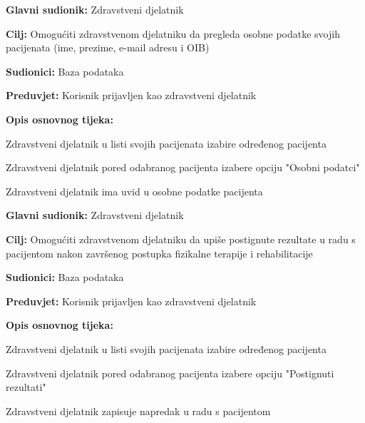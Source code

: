 \noindent {}
\begin{packed_item}
	
	\item \textbf{Glavni sudionik: }Zdravstveni djelatnik
	\item  \textbf{Cilj:} Omogućiti zdravstvenom djelatniku da pregleda osobne podatke svojih pacijenata (ime, prezime, e-mail adresu i OIB)
	\item  \textbf{Sudionici:} Baza podataka
	\item  \textbf{Preduvjet:} Korisnik prijavljen kao zdravstveni djelatnik
	\item  \textbf{Opis osnovnog tijeka:}
	
	\item[] \begin{packed_enum}
		
		\item Zdravstveni djelatnik u listi svojih pacijenata izabire određenog pacijenta
		\item Zdravstveni djelatnik pored odabranog pacijenta izabere opciju "Osobni podatci"
		\item Zdravstveni djelatnik ima uvid u osobne podatke pacijenta
	\end{packed_enum}
	
\end{packed_item}

\noindent {}
\begin{packed_item}
	
	\item \textbf{Glavni sudionik: }Zdravstveni djelatnik
	\item  \textbf{Cilj:} Omogućiti zdravstvenom djelatniku da upiše postignute rezultate u radu s pacijentom nakon završenog postupka fizikalne terapije i rehabilitacije
	\item  \textbf{Sudionici:} Baza podataka
	\item  \textbf{Preduvjet:} Korisnik prijavljen kao zdravstveni djelatnik
	\item  \textbf{Opis osnovnog tijeka:}
	
	\item[] \begin{packed_enum}
		
		\item Zdravstveni djelatnik u listi svojih pacijenata izabire određenog pacijenta
		\item Zdravstveni djelatnik pored odabranog pacijenta izabere opciju "Postignuti rezultati"
		\item Zdravstveni djelatnik zapisuje napredak u radu s pacijentom
	\end{packed_enum}
	
\end{packed_item}

